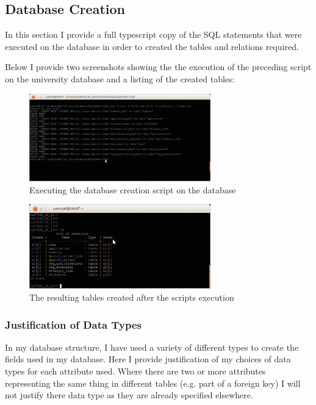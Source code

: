 \documentclass{article}
\begin{document}
\subsection{Database Creation}
In this section I provide a full typescript copy of the SQL statements that were executed on the database in order to created the tables and relations required.



Below I provide two screenshots showing the the execution of the preceding script on the university database and a listing of the created tables:

\begin{figure}[H]
\centering
\includegraphics[width=0.7\textwidth]{img/db-create.png}
\caption{Executing the database creation script on the database}
\label{fig:db-create}
\end{figure}

\begin{figure}[H]
\centering
\includegraphics[width=0.7\textwidth]{img/db-show-tables.png}
\caption{The resulting tables created after the scripts execution}
\label{fig:db-show-tables}
\end{figure}

\subsubsection{Justification of Data Types}
In my database structure, I have used a variety of different types to create the fields used in my database. Here I provide justification of my choices of data types for each attribute used. Where there are two or more attributes representing the same thing in different tables (e.g. part of a foreign key) I will not justify there data type as they are already specified elsewhere.
\end{document}
